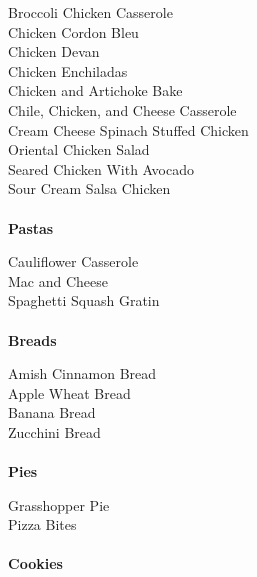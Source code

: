 \documentclass[11pt, twoside, openany]{book}
\begin{document}
Broccoli Chicken Casserole\hrulefill\pageref{broccoli-chicken-casserole}\\
Chicken Cordon Bleu\hrulefill\pageref{chicken-cordon-bleu}\\
Chicken Devan\hrulefill\pageref{chicken-devan}\\
Chicken Enchiladas\hrulefill\pageref{chicken-enchiladas}\\
Chicken and Artichoke Bake\hrulefill\pageref{chicken-and-artichoke-bake}\\
Chile, Chicken, and Cheese Casserole\hrulefill\pageref{chile,-chicken,-and-cheese-casserole}\\
Cream Cheese Spinach Stuffed Chicken\hrulefill\pageref{cream-cheese-spinach-stuffed-chicken}\\
Oriental Chicken Salad\hrulefill\pageref{oriental-chicken-salad}\\
Seared Chicken With Avocado\hrulefill\pageref{seared-chicken-with-avocado}\\
Sour Cream Salsa Chicken\hrulefill\pageref{sour-cream-salsa-chicken}\\
{~\vspace{2mm}\\ \Large \textbf{Pastas}}\hfill\textbf{\pageref{pastas}}

Cauliflower Casserole\hrulefill\pageref{cauliflower-casserole}\\
Mac and Cheese\hrulefill\pageref{mac-and-cheese}\\
Spaghetti Squash Gratin\hrulefill\pageref{spaghetti-squash-gratin}\\
{~\vspace{2mm}\\ \Large \textbf{Breads}}\hfill\textbf{\pageref{breads}}

Amish Cinnamon Bread\hrulefill\pageref{amish-cinnamon-bread}\\
Apple Wheat Bread\hrulefill\pageref{apple-wheat-bread}\\
Banana Bread\hrulefill\pageref{banana-bread}\\
Zucchini Bread\hrulefill\pageref{zucchini-bread}\\
{~\vspace{2mm}\\ \Large \textbf{Pies}}\hfill\textbf{\pageref{pies}}

Grasshopper Pie\hrulefill\pageref{grasshopper-pie}\\
Pizza Bites\hrulefill\pageref{pizza-bites}\\
{~\vspace{2mm}\\ \Large \textbf{Cookies}}\hfill\textbf{\pageref{cookies}}
\end{document}
